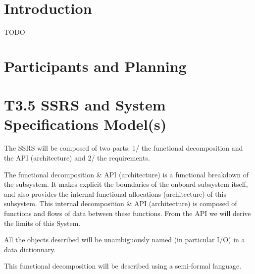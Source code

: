 \documentclass{template/openetcs_article}
\begin{document}
\newenvironment{inoutput}
{\vspace{2mm}
\noindent
\begin{tabular}{|r|p{.68\linewidth}|l|}
\hline}
{
\hline
\end{tabular}}

\section*{Introduction}

TODO

\section{Participants and Planning}


\section{T3.5 SSRS and System Specifications Model(s)}


The SSRS will be composed of two parts: 1/ the functional decomposition and the API (architecture) and 2/ the requirements. 

The functional decomposition & API (architecture) is a functional breakdown of the subsystem. It makes explicit the boundaries of the onboard subsystem itself, and also provides the internal functional allocations (architecture) of this subsystem. This internal decomposition & API (architecture) is composed of functions and flows of data between these functions. From the API we will derive the limits of this System. 

All the objects described will be unambiguously named (in particular I/O) in a data dictionnary. 

This functional decomposition will be described using a semi-formal language.
\end{document}
